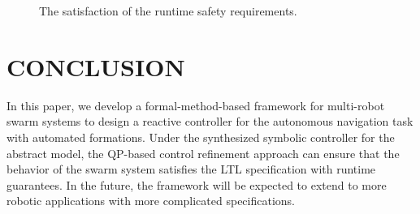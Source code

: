 \documentclass[letterpaper, 10 pt, conference]{ieeeconf}
\begin{document}
\begin{figure}[htbp]
\noindent
\hspace*{\fill}
\hspace{\fill}
\caption{The satisfaction of the runtime safety requirements.}
\label{fig:formation}
\end{figure}

\section{CONCLUSION}\label{sec:con}
In this paper, we develop a formal-method-based framework for multi-robot swarm systems to design a reactive controller for the autonomous navigation task with automated formations. Under the synthesized symbolic controller for the abstract model, the QP-based control refinement approach can ensure that the behavior of the swarm system satisfies the LTL specification with runtime guarantees. In the future, the framework will be expected to extend to more robotic applications with more complicated specifications.



\balance




%
%
\end{document}
